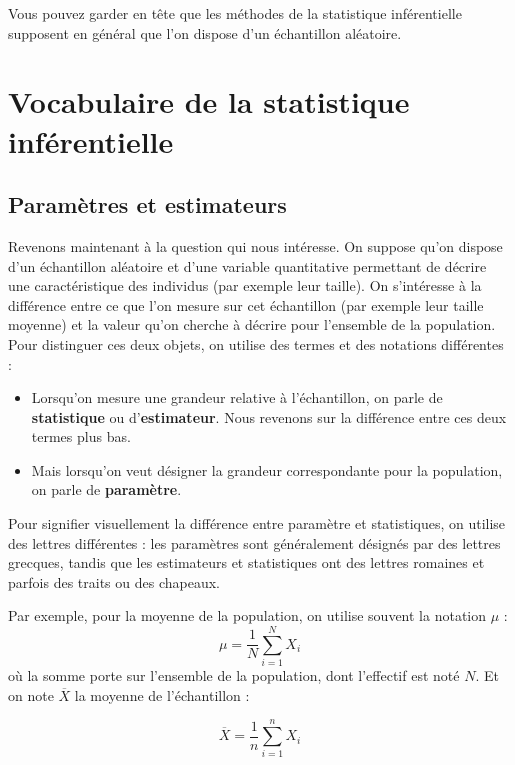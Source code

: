 \documentclass[
]{book}
\providecommand{\tightlist}{%
  \setlength{\itemsep}{0pt}\setlength{\parskip}{0pt}}
\begin{document}
Vous pouvez garder en tête que les méthodes de la statistique inférentielle supposent en général que l'on dispose d'un échantillon aléatoire.

\hypertarget{vocabulaire-de-la-statistique-infuxe9rentielle}{%
\section{Vocabulaire de la statistique inférentielle}\label{vocabulaire-de-la-statistique-infuxe9rentielle}}

\hypertarget{paramuxe8tres-et-estimateurs}{%
\subsection{Paramètres et estimateurs}\label{paramuxe8tres-et-estimateurs}}

Revenons maintenant à la question qui nous intéresse. On suppose qu'on dispose d'un échantillon aléatoire et d'une variable quantitative permettant de décrire une caractéristique des individus (par exemple leur taille). On s'intéresse à la différence entre ce que l'on mesure sur cet échantillon (par exemple leur taille moyenne) et la valeur qu'on cherche à décrire pour l'ensemble de la population. Pour distinguer ces deux objets, on utilise des termes et des notations différentes :

\begin{itemize}
\tightlist
\item
  Lorsqu'on mesure une grandeur relative à l'échantillon, on parle de \textbf{statistique} ou d'\textbf{estimateur}. Nous revenons sur la différence entre ces deux termes plus bas.
\item
  Mais lorsqu'on veut désigner la grandeur correspondante pour la population, on parle de \textbf{paramètre}.
\end{itemize}

Pour signifier visuellement la différence entre paramètre et statistiques, on utilise des lettres différentes : les paramètres sont généralement désignés par des lettres grecques, tandis que les estimateurs et statistiques ont des lettres romaines et parfois des traits ou des chapeaux.

Par exemple, pour la moyenne de la population, on utilise souvent la notation \(\mu\) : \[ \mu  = \frac{1}{N} \sum_{i=1}^{N} X_i \] où la somme porte sur l'ensemble de la population, dont l'effectif est noté \(N\). Et on note \(\overline{X}\) la moyenne de l'échantillon :

\[ \overline{X} = \frac{1}{n} \sum_{i=1}^{n} X_i\]
\end{document}
